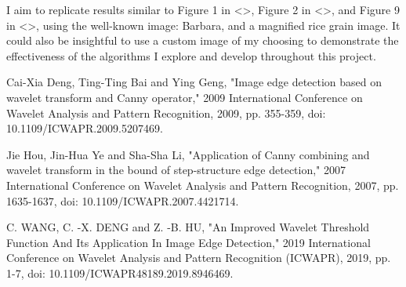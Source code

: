 \documentclass[./abstract_proposal.tex]{subfiles}
\begin{document}
\noindent I aim to replicate results similar to Figure 1 in <>, Figure 2 in <>, and Figure 9 in <>, using the well-known image: Barbara, and a magnified rice grain image.  It could also be insightful to use a custom image of my choosing to demonstrate the effectiveness of the algorithms I explore and develop throughout this project.   

\clearpage

\begin{thebibliography}{9}
Cai-Xia Deng, Ting-Ting Bai and Ying Geng, "Image edge detection based on wavelet transform and Canny operator," 2009 International Conference on Wavelet Analysis and Pattern Recognition, 2009, pp. 355-359, doi: 10.1109/ICWAPR.2009.5207469.

Jie Hou, Jin-Hua Ye and Sha-Sha Li, "Application of Canny combining and wavelet transform in the bound of step-structure edge detection," 2007 International Conference on Wavelet Analysis and Pattern Recognition, 2007, pp. 1635-1637, doi: 10.1109/ICWAPR.2007.4421714.

C. WANG, C. -X. DENG and Z. -B. HU, "An Improved Wavelet Threshold Function And Its Application In Image Edge Detection," 2019 International Conference on Wavelet Analysis and Pattern Recognition (ICWAPR), 2019, pp. 1-7, doi: 10.1109/ICWAPR48189.2019.8946469.


\end{thebibliography}
\end{document}
